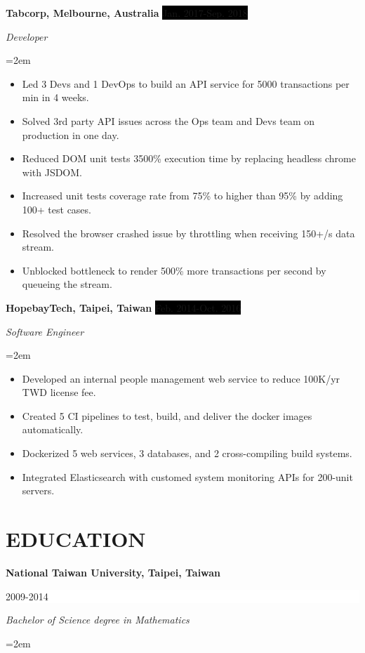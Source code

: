\documentclass[a4paper, 11pt]{article}
\newcommand{\sepspace}{\vspace*{0.3em}}       %
\newcommand{\NewPart}[1]{\section*{\uppercase{#1}}}
\newcommand{\EducationEntry}[4]{
		\noindent \textbf{#1} \hfill      %
		\colorbox{White}{%
			\parbox{5cm}{%
			\hfill\color{Black}#2}} \par  %
		\noindent \textit{#3} \par        %
		\noindent\hangindent=2em\hangafter=0 \small #4 %
		\normalsize \par}
\newcommand{\WorkEntry}[4]{				  %
		\noindent \textbf{#1} \hfill      %
		\noindent\colorbox{Black}{\color{White}#2} \par  %
		\noindent \textit{#3} \par              %
		\noindent\hangindent=2em\hangafter=0 \small #4 %
		\normalsize \par}
\newcommand{\PrjEntry}[4]{				  %
		\noindent \textbf{#1} \hfill      %
		\noindent\colorbox{Black}{\color{White}#2} \par  %
		\noindent \textit{#3} \par              %
		\noindent\hangindent=2em\hangafter=0 \small #4 %
		\normalsize \par}
\begin{document}
\sepspace

\WorkEntry{Tabcorp, Melbourne, Australia}{Jan. 2017-Sep. 2018}{Developer}{
\begin{itemize}
	\item {Led 3 Devs and 1 DevOps to build an API service for 5000 transactions per min in 4 weeks.}
	\item {Solved 3rd party API issues across the Ops team and Devs team on production in one day.}
	\item {Reduced DOM unit tests 3500\% execution time by replacing headless chrome with JSDOM.}
	\item {Increased unit tests coverage rate from 75\% to higher than 95\% by adding 100+ test cases.}
	\item {Resolved the browser crashed issue by throttling when receiving 150+/s data stream.}
	\item {Unblocked bottleneck to render 500\% more transactions per second by queueing the stream.}
\end{itemize}
}

\sepspace

\WorkEntry{HopebayTech, Taipei, Taiwan}{Feb. 2014-Oct. 2016}{Software Engineer}{
\begin{itemize}
	\item {Developed an internal people management web service to reduce 100K/yr TWD license fee.}
	\item {Created 5 CI pipelines to test, build, and deliver the docker images automatically.}
	\item {Dockerized 5 web services, 3 databases, and 2 cross-compiling build systems.}
	\item {Integrated Elasticsearch with customed system monitoring APIs for 200-unit servers.}
\end{itemize}
}

\NewPart{Education}{}

\EducationEntry{National Taiwan University, Taipei, Taiwan}{2009-2014}
{Bachelor of Science degree in Mathematics}{}


\end{document}
